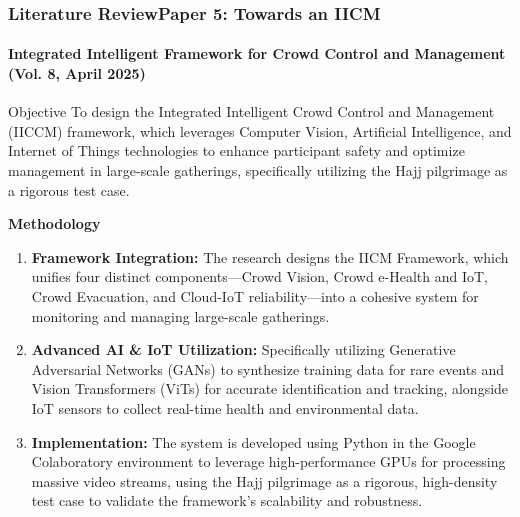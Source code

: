 \documentclass{beamer}
\begin{document}
\begin{frame}
\frametitle{Literature Review\newline Paper 5: Towards an IICM}
\framesubtitle{Integrated Intelligent Framework for Crowd Control and Management (Vol. 8, April 2025)}
\scriptsize

\begin{block}{Objective}
To design the Integrated Intelligent Crowd Control and Management (IICCM) framework, which leverages Computer Vision, Artificial Intelligence, and Internet of Things technologies to enhance participant safety and optimize management in large-scale gatherings, specifically utilizing the Hajj pilgrimage as a rigorous test case.
\end{block}



\textbf{Methodology}
\begin{enumerate}
    \item \textbf{Framework Integration:} The research designs the IICM Framework, which unifies four distinct components—Crowd Vision, Crowd e-Health and IoT, Crowd Evacuation, and Cloud-IoT reliability—into a cohesive system for monitoring and managing large-scale gatherings.
    \item \textbf{Advanced AI \& IoT Utilization:} Specifically utilizing Generative Adversarial Networks (GANs) to synthesize training data for rare events and Vision Transformers (ViTs) for accurate identification and tracking, alongside IoT sensors to collect real-time health and environmental data.
    \item \textbf{Implementation:} The system is developed using Python in the Google Colaboratory environment to leverage high-performance GPUs for processing massive video streams, using the Hajj pilgrimage as a rigorous, high-density test case to validate the framework's scalability and robustness.
\end{enumerate}
\end{frame}
\end{document}
